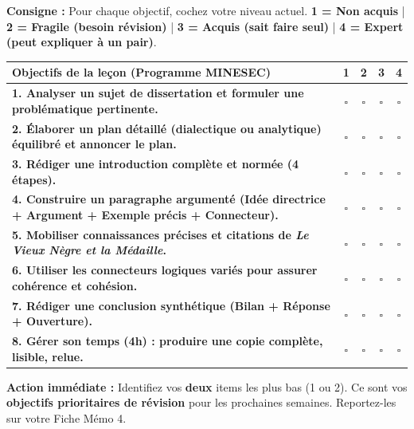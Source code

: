 \documentclass[11pt]{article}
\begin{document}
\begin{exemplebox}
\textbf{Consigne :} Pour chaque objectif, cochez votre niveau actuel. \textbf{1 = Non acquis} | \textbf{2 = Fragile (besoin révision)} | \textbf{3 = Acquis (sait faire seul)} | \textbf{4 = Expert (peut expliquer à un pair)}.

\begin{center}
\begin{tabularx}{\linewidth}{|>{\bfseries}X|c|c|c|c|}\hline
\textbf{Objectifs de la leçon (Programme MINESEC)} & \textbf{1} & \textbf{2} & \textbf{3} & \textbf{4} \\ \hline
1. Analyser un sujet de dissertation et formuler une problématique pertinente. & $\square$ & $\square$ & $\square$ & $\square$ \\ \hline
2. Élaborer un plan détaillé (dialectique ou analytique) équilibré et annoncer le plan. & $\square$ & $\square$ & $\square$ & $\square$ \\ \hline
3. Rédiger une introduction complète et normée (4 étapes). & $\square$ & $\square$ & $\square$ & $\square$ \\ \hline
4. Construire un paragraphe argumenté (Idée directrice + Argument + Exemple précis + Connecteur). & $\square$ & $\square$ & $\square$ & $\square$ \\ \hline
5. Mobiliser connaissances précises et citations de \emph{Le Vieux Nègre et la Médaille}. & $\square$ & $\square$ & $\square$ & $\square$ \\ \hline
6. Utiliser les connecteurs logiques variés pour assurer cohérence et cohésion. & $\square$ & $\square$ & $\square$ & $\square$ \\ \hline
7. Rédiger une conclusion synthétique (Bilan + Réponse + Ouverture). & $\square$ & $\square$ & $\square$ & $\square$ \\ \hline
8. Gérer son temps (4h) : produire une copie complète, lisible, relue. & $\square$ & $\square$ & $\square$ & $\square$ \\ \hline
\end{tabularx}
\end{center}
\textbf{Action immédiate :} Identifiez vos \textbf{deux} items les plus bas (1 ou 2). Ce sont vos \textbf{objectifs prioritaires de révision} pour les prochaines semaines. Reportez-les sur votre Fiche Mémo 4.
\end{exemplebox}
\end{document}

